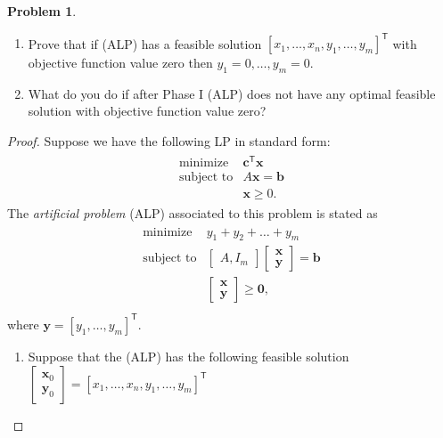 \documentclass[12pt]{article}
\theoremstyle{definition}
\newtheorem{problem}{Problem}
\newcommand{\vect}[1]{\boldsymbol{#1}}
\newcommand{\tran}{\mathsf{T}}
\begin{document}
\begin{problem}
  \begin{enumerate}
    \item Prove that if (ALP) has a feasible solution $[x_1, \dots, x_n, y_1, \dots, y_m]^\tran$
      with objective function value zero then $y_1 = 0, \dots, y_m = 0$.
    \item What do you do if after Phase I (ALP) does not have any optimal feasible
      solution with objective function value zero?
  \end{enumerate}
\end{problem}

\begin{proof}
  Suppose we have the following LP in standard form:
  \begin{align*}
    \begin{array}{rl}
      \text{minimize} & \vect{c}^\tran \vect{x}\\
      \text{subject to} & A\vect{x} = \vect{b}\\
      & \vect{x} \geq 0.
    \end{array}
  \end{align*}
  The \textit{artificial problem} (ALP) associated to this problem is stated as
  \begin{align}\label{alp}
    \begin{array}{rl}
      \text{minimize} & y_1 + y_2 + \dots + y_m \\
      \text{subject to} & \begin{bmatrix}A, I_m\end{bmatrix} \begin{bmatrix}\vect{x} \\ \vect{y}\end{bmatrix} = \vect{b} \\
      & \begin{bmatrix} \vect{x} \\ \vect{y} \end{bmatrix} \geq \vect{0},\\
    \end{array}
  \end{align}
  where $\vect{y} = [y_1, \dots, y_m]^\tran$.
  \begin{enumerate}
    \item Suppose that the (ALP) has the following feasible solution
      $\begin{bmatrix}\vect{x}_0 \\ \vect{y}_0\end{bmatrix} = [x_1, \dots, x_n, y_1, \dots, y_m]^\tran$

\end{enumerate}
\end{proof}
\end{document}
